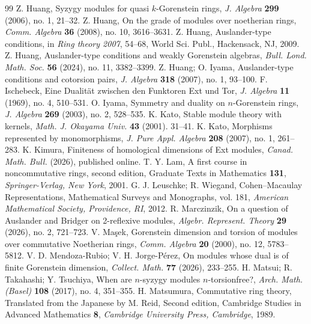 \documentclass{amsart}
\theoremstyle{definition}
\theoremstyle{remark}
\numberwithin{equation}{thm}
\begin{document}
\begin{thebibliography}{99}
{\sc Z. Huang}, Syzygy modules for quasi $k$-Gorenstein rings, {\em J. Algebra} {\bf 299} (2006), no. 1, 21--32.
{\sc Z. Huang}, On the grade of modules over noetherian rings, {\em Comm. Algebra} {\bf 36} (2008), no. 10, 3616--3631.
{\sc Z. Huang}, Auslander-type conditions, in {\em Ring theory 2007}, 54--68, World Sci. Publ., Hackensack, NJ, 2009.
{\sc Z. Huang}, Auslander-type conditions and weakly Gorenstein algebras, {\em Bull. Lond. Math. Soc.} {\bf 56} (2024), no. 11, 3382--3399.
{\sc Z. Huang; O. Iyama}, Auslander-type conditions and cotorsion pairs, {\em J. Algebra} {\bf 318} (2007), no. 1, 93--100.
{\sc F. Ischebeck}, Eine Dualit\"at zwischen den Funktoren Ext und Tor, {\em J. Algebra} {\bf 11} (1969), no. 4, 510--531.
{\sc O. Iyama}, Symmetry and duality on $n$-Gorenstein rings, {\em J. Algebra} {\bf 269} (2003), no. 2, 528--535.
{\sc K. Kato}, Stable module theory with kernels, {\em Math. J. Okayama Univ.} {\bf 43} (2001). 31--41.
{\sc K. Kato}, Morphisms represented by monomorphisms, {\em J. Pure Appl. Algebra} {\bf 208} (2007), no. 1, 261--283.
{\sc K. Kimura}, Finiteness of homological dimensions of Ext modules, {\em Canad. Math. Bull.} (2026), published online.
{\sc T. Y. Lam}, A first course in noncommutative rings, second edition, Graduate Texts in Mathematics {\bf 131}, {\em Springer-Verlag, New York}, 2001.
{\sc G. J. Leuschke; R. Wiegand}, Cohen--Macaulay Representations, Mathematical Surveys and Monographs, vol. 181, {\em American Mathematical Society, Providence, RI}, 2012.
{\sc R. Marczinzik}, On a question of Auslander and Bridger on 2-reflexive modules, {\em Algebr. Represent. Theory} {\bf 29} (2026), no. 2, 721--723.
{\sc V. Ma\c{s}ek}, Gorenstein dimension and torsion of modules over commutative Noetherian rings, {\em Comm. Algebra} {\bf 20} (2000), no. 12, 5783--5812.
{\sc V. D. Mendoza-Rubio; V. H. Jorge-P\'erez}, On modules whose dual is of finite Gorenstein dimension, {\em Collect. Math.} {\bf 77} (2026), 233--255.
{\sc H. Matsui; R. Takahashi; Y. Tsuchiya}, When are $n$-syzygy modules $n$-torsionfree?, {\em Arch. Math. (Basel)} {\bf 108} (2017), no. 4, 351--355.
{\sc H. Matsumura}, Commutative ring theory, Translated from the Japanese by M. Reid, Second edition, Cambridge Studies in Advanced Mathematics {\bf 8}, {\em Cambridge University Press, Cambridge}, 1989.

\end{thebibliography}
\end{document}
